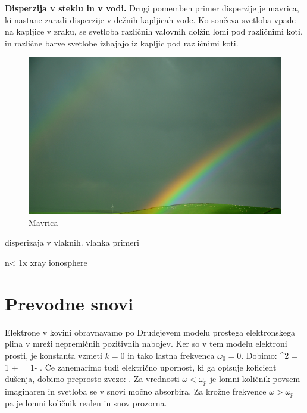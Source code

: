 \begin{example}{\bf Disperzija v steklu in v vodi.}
Drugi pomemben primer disperzije je mavrica, ki nastane zaradi
disperzije v dežnih kapljicah vode. Ko sončeva svetloba vpade
na kapljice v zraku, se svetloba različnih valovnih dolžin 
lomi pod različnimi koti, in različne barve svetlobe izhajajo
iz kapljic pod različnimi koti. 
\begin{figure}[ht]
\centering
\includegraphics[width=7truecm]{slike/09_mavrica_photo.jpg}
\caption{Mavrica}
\label{fig:09_mavrica}
\end{figure}

\end{example}

disperizaja v vlaknih.
vlanka
primeri

n< 1x xray ionosphere


\section{Prevodne snovi}
Elektrone v kovini obravnavamo po Drudejevem modelu prostega elektronskega plina
v mreži nepremičnih pozitivnih nabojev. Ker so v tem modelu elektroni prosti,
je konstanta vzmeti $k=0$ in tako lastna frekvenca $\omega_0=0$. Dobimo:
\beq
{}^2 = 1 +  = 1- 
.
\label{eq:09_36}
\eeq
Če zanemarimo tudi električno upornost, ki ga opisuje koficient dušenja, dobimo
preprosto zvezo:
\beq
{} \approx {}.
\label{eq:09_37}
\eeq
Za vrednosti $\omega < \omega_p$ je lomni količnik povsem imaginaren in svetloba se v snovi
močno absorbira. Za krožne frekvence $\omega > \omega_p$ pa je lomni količnik realen 
in snov prozorna. 

